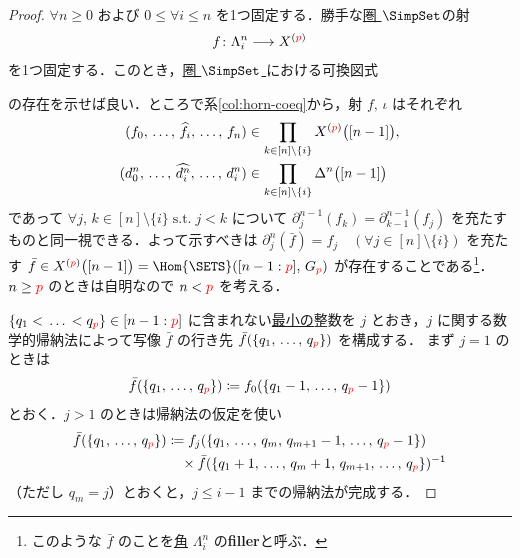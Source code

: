 \documentclass[TQFT_main]{subfiles}
\begin{document}
\begin{proof}
    $\forall n \ge 0$ および $0 \le \forall i \le n$ を1つ固定する．勝手な\hyperref[def:SimpSet]{圏 $\SimpSet$}の射
    \begin{align}
        f \colon \Lambda^n_i \longrightarrow X^{(\textcolor{red}{p})}
    \end{align}
    を1つ固定する．このとき，\hyperref[def:SimpSet]{圏 $\SimpSet$ }における可換図式
    \begin{center}
    \end{center}
    の存在を示せば良い．ところで系\ref{col:horn-coeq}から，射 $f,\, \iota$ はそれぞれ
    \begin{align}
        (f_0,\, \dots,\, \widehat{f_i},\, \dots,\, f_n) &\in \prod_{k \in [n] \setminus \{i\}} X^{(\textcolor{red}{p})} \bigl( [n-1] \bigr), \\
        (d^n_0,\, \dots,\, \widehat{d^n_i},\, \dots,\, d^n_i) &\in \prod_{k \in [n] \setminus \{i\}} \Delta^n\bigl([n-1]\bigr)
    \end{align}
    であって $\forall j,\, k \in [n] \setminus \{i\}\; \mathrm{s.t.}\; j < k$ について $\partial^{n-1}_j (f_k) = \partial^{n-1}_{k-1} (f_j)$ を充たすものと同一視できる．よって示すべきは $\partial^n_j (\bar{f}) = f_j\quad (\forall j \in [n]\setminus \{i\})$ を充たす $\bar{f} \in X^{(\textcolor{red}{p})} \bigl( [n-1] \bigr) = \Hom{\SETS} ([n-1:\textcolor{red}{p}],\, G_{\textcolor{red}{p}})$ が存在することである\footnote{このような $\bar{f}$ のことを\hyperref[def:horn]{角} $\Lambda^n_i$ の\textbf{filler}と呼ぶ．}．
    $n \ge \textcolor{red}{p}$ のときは自明なので $n < \textcolor{red}{p}$ を考える．
    
    $\{q_1 <\, \dots \, < q_{\textcolor{red}{p}}\} \in [n-1:\textcolor{red}{p}]$ に含まれない\underline{最小の}整数を $j$ とおき，$j$ に関する数学的帰納法によって写像 $\bar{f}$ の行き先 $\bar{f}(\{q_1,\, \dots,\, q_{\textcolor{red}{p}}\})$ を構成する．
    まず $j=1$ のときは
    \begin{align}
        \bar{f}(\{q_1,\, \dots,\, q_{\textcolor{red}{p}}\}) \coloneqq f_0 (\{q_1-1,\, \dots,\, q_{\textcolor{red}{p}}-1\})
    \end{align}
    とおく．$j>1$ のときは帰納法の仮定を使い
    \begin{align}
        \bar{f}(\{q_1,\, \dots,\, q_{\textcolor{red}{p}}\}) 
        &\coloneqq f_j (\{q_1,\, \dots,\, q_m,\, q_{m+1}-1,\, \dots,\, q_{\textcolor{red}{p}} - 1\}) \\
        &\quad \times \bar{f} (\{q_1 +1,\, \dots,\, q_m+1,\, q_{m+1},\, \dots,\, q_{\textcolor{red}{p}}\})^{-1}
    \end{align}
    （ただし $q_m = j$）とおくと，$j \le i-1$ までの帰納法が完成する．


\end{proof}
\end{document}

